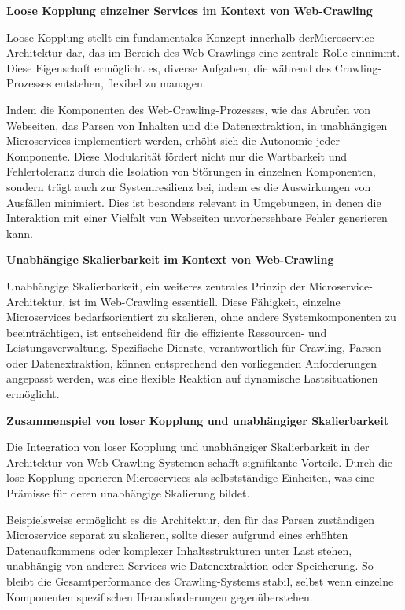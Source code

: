 \textbf{Loose Kopplung einzelner Services im Kontext von Web-Crawling}

Loose Kopplung stellt ein fundamentales Konzept innerhalb der\newline Microservice-Architektur dar, das im Bereich des Web-Crawlings eine zentrale Rolle einnimmt. Diese Eigenschaft ermöglicht es, diverse Aufgaben, die während des Crawling-Prozesses entstehen, flexibel zu managen.

Indem die Komponenten des Web-Crawling-Prozesses, wie das Abrufen von Webseiten, das Parsen von Inhalten und die Datenextraktion, in unabhängigen Microservices implementiert werden, erhöht sich die Autonomie jeder Komponente. Diese Modularität fördert nicht nur die Wartbarkeit und Fehlertoleranz durch die Isolation von Störungen in einzelnen Komponenten, sondern trägt auch zur Systemresilienz bei, indem es die Auswirkungen von Ausfällen minimiert. Dies ist besonders relevant in Umgebungen, in denen die Interaktion mit einer Vielfalt von Webseiten unvorhersehbare Fehler generieren kann.

\textbf{Unabhängige Skalierbarkeit im Kontext von Web-Crawling}

Unabhängige Skalierbarkeit, ein weiteres zentrales Prinzip der \newline Microservice-Architektur, ist im Web-Crawling essentiell. Diese Fähigkeit, einzelne Microservices bedarfsorientiert zu skalieren, ohne andere Systemkomponenten zu beeinträchtigen, ist entscheidend für die effiziente Ressourcen- und Leistungsverwaltung. Spezifische Dienste, verantwortlich für Crawling, Parsen oder Datenextraktion, können entsprechend den vorliegenden Anforderungen angepasst werden, was eine flexible Reaktion auf dynamische Lastsituationen ermöglicht.

\textbf{Zusammenspiel von loser Kopplung und unabhängiger Skalierbarkeit}

Die Integration von loser Kopplung und unabhängiger Skalierbarkeit in der Architektur von Web-Crawling-Systemen schafft signifikante Vorteile. Durch die lose Kopplung operieren Microservices als selbstständige Einheiten, was eine Prämisse für deren unabhängige Skalierung bildet.

Beispielsweise ermöglicht es die Architektur, den für das Parsen zuständigen Microservice separat zu skalieren, sollte dieser aufgrund eines erhöhten Datenaufkommens oder komplexer Inhaltsstrukturen unter Last stehen, unabhängig von anderen Services wie Datenextraktion oder Speicherung. So bleibt die Gesamtperformance des Crawling-Systems stabil, selbst wenn einzelne Komponenten spezifischen Herausforderungen gegenüberstehen.

